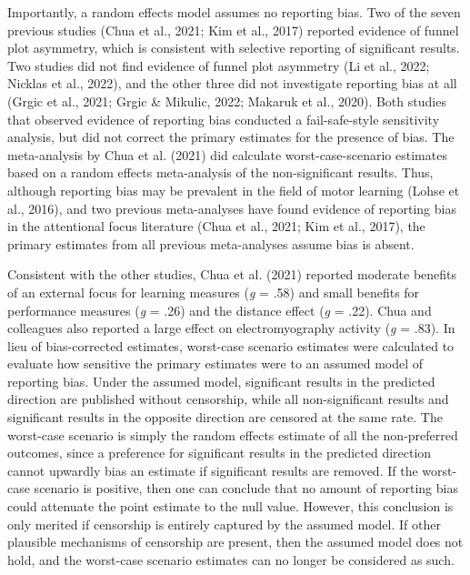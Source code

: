 \documentclass[
  11pt,
  doc, donotrepeattitle,floatsintext]{apa7}
\begin{document}
Importantly, a random effects model assumes no reporting bias. Two of the seven previous studies (Chua et al., 2021; Kim et al., 2017) reported evidence of funnel plot asymmetry, which is consistent with selective reporting of significant results. Two studies did not find evidence of funnel plot asymmetry (Li et al., 2022; Nicklas et al., 2022), and the other three did not investigate reporting bias at all (Grgic et al., 2021; Grgic \& Mikulic, 2022; Makaruk et al., 2020). Both studies that observed evidence of reporting bias conducted a fail-safe-style sensitivity analysis, but did not correct the primary estimates for the presence of bias. The meta-analysis by Chua et al. (2021) did calculate worst-case-scenario estimates based on a random effects meta-analysis of the non-significant results. Thus, although reporting bias may be prevalent in the field of motor learning (Lohse et al., 2016), and two previous meta-analyses have found evidence of reporting bias in the attentional focus literature (Chua et al., 2021; Kim et al., 2017), the primary estimates from all previous meta-analyses assume bias is absent.

Consistent with the other studies, Chua et al. (2021) reported moderate benefits of an external focus for learning measures (\emph{g} = .58) and small benefits for performance measures (\emph{g} = .26) and the distance effect (\emph{g} = .22). Chua and colleagues also reported a large effect on electromyography activity (\emph{g} = .83). In lieu of bias-corrected estimates, worst-case scenario estimates were calculated to evaluate how sensitive the primary estimates were to an assumed model of reporting bias. Under the assumed model, significant results in the predicted direction are published without censorship, while all non-significant results and significant results in the opposite direction are censored at the same rate. The worst-case scenario is simply the random effects estimate of all the non-preferred outcomes, since a preference for significant results in the predicted direction cannot upwardly bias an estimate if significant results are removed. If the worst-case scenario is positive, then one can conclude that no amount of reporting bias could attenuate the point estimate to the null value. However, this conclusion is only merited if censorship is entirely captured by the assumed model. If other plausible mechanisms of censorship are present, then the assumed model does not hold, and the worst-case scenario estimates can no longer be considered as such.
\end{document}

